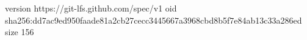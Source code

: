 version https://git-lfs.github.com/spec/v1
oid sha256:dd7ac9ed950faade81a2cb27cecc3445667a3968cbd8b5f7e84ab13c33a286ed
size 156
